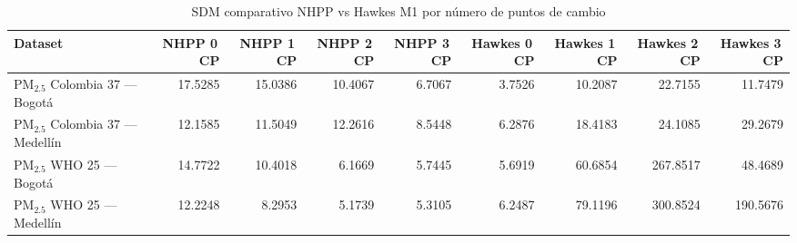 \begin{table}[htbp]
\centering
\caption{SDM comparativo NHPP vs Hawkes M1 por n\'{u}mero de puntos de cambio}
\label{tab:comp_sdm}
\begin{tabular}{lrrrrrrrr}
\toprule
Dataset & NHPP 0\,CP & NHPP 1\,CP & NHPP 2\,CP & NHPP 3\,CP & Hawkes 0\,CP & Hawkes 1\,CP & Hawkes 2\,CP & Hawkes 3\,CP \\
\midrule
PM$_{2.5}$ Colombia 37 --- Bogot\'{a} & 17.5285 & 15.0386 & 10.4067 & 6.7067 & 3.7526 & 10.2087 & 22.7155 & 11.7479 \\
PM$_{2.5}$ Colombia 37 --- Medell\'{i}n & 12.1585 & 11.5049 & 12.2616 & 8.5448 & 6.2876 & 18.4183 & 24.1085 & 29.2679 \\
PM$_{2.5}$ WHO 25 --- Bogot\'{a} & 14.7722 & 10.4018 & 6.1669 & 5.7445 & 5.6919 & 60.6854 & 267.8517 & 48.4689 \\
PM$_{2.5}$ WHO 25 --- Medell\'{i}n & 12.2248 & 8.2953 & 5.1739 & 5.3105 & 6.2487 & 79.1196 & 300.8524 & 190.5676 \\
\bottomrule
\end{tabular}
\end{table}
